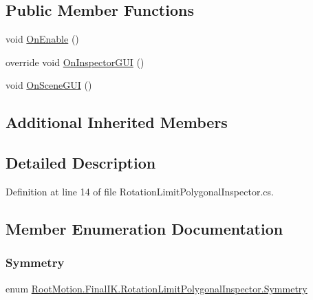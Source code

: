 \subsection*{Public Member Functions}
\begin{DoxyCompactItemize}
\item 
void \mbox{\hyperlink{class_root_motion_1_1_final_i_k_1_1_rotation_limit_polygonal_inspector_a60117aea100e46ae30ed2294e255c59b}{On\+Enable}} ()
\item 
override void \mbox{\hyperlink{class_root_motion_1_1_final_i_k_1_1_rotation_limit_polygonal_inspector_aca31087c4625de583b6f5228c257ec03}{On\+Inspector\+G\+UI}} ()
\item 
void \mbox{\hyperlink{class_root_motion_1_1_final_i_k_1_1_rotation_limit_polygonal_inspector_aeab7590fd9b3e2f687c80ac1f9038586}{On\+Scene\+G\+UI}} ()
\end{DoxyCompactItemize}
\subsection*{Additional Inherited Members}


\subsection{Detailed Description}


Definition at line 14 of file Rotation\+Limit\+Polygonal\+Inspector.\+cs.



\subsection{Member Enumeration Documentation}
\mbox{\label{class_root_motion_1_1_final_i_k_1_1_rotation_limit_polygonal_inspector_a5f55b8c8d988e874fa81f18677d3d2d1}} 
\subsubsection{\texorpdfstring{Symmetry}{Symmetry}}
{\footnotesize\ttfamily enum \mbox{\hyperlink{class_root_motion_1_1_final_i_k_1_1_rotation_limit_polygonal_inspector_a5f55b8c8d988e874fa81f18677d3d2d1}{Root\+Motion.\+Final\+I\+K.\+Rotation\+Limit\+Polygonal\+Inspector.\+Symmetry}}\hspace{0.3cm}{\ttfamily [strong]}}

